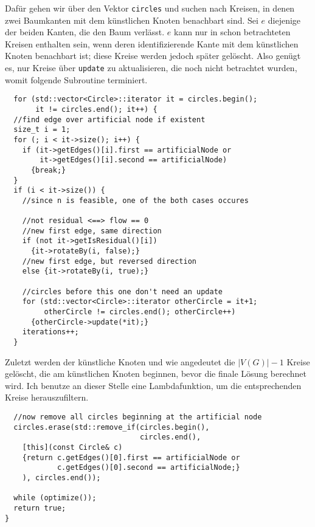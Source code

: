 Dafür gehen wir über den Vektor \lstinline|circles| und suchen nach Kreisen, in denen zwei Baumkanten mit dem künstlichen Knoten benachbart sind. Sei $e$ diejenige der beiden Kanten, die den Baum verlässt. $e$ kann nur in schon betrachteten Kreisen enthalten sein, wenn deren identifizierende Kante mit dem künstlichen Knoten benachbart ist; diese Kreise werden jedoch später gelöscht. Also genügt es, nur Kreise über \lstinline|update| zu aktualisieren, die noch nicht betrachtet wurden, womit folgende Subroutine terminiert.

\begin{lstlisting}
  for (std::vector<Circle>::iterator it = circles.begin();
       it != circles.end(); it++) {
  //find edge over artificial node if existent
  size_t i = 1;
  for (; i < it->size(); i++) {
    if (it->getEdges()[i].first == artificialNode or
        it->getEdges()[i].second == artificialNode)
      {break;}
  }
  if (i < it->size()) {
    //since n is feasible, one of the both cases occures

    //not residual <==> flow == 0
    //new first edge, same direction
    if (not it->getIsResidual()[i])
      {it->rotateBy(i, false);}
    //new first edge, but reversed direction
    else {it->rotateBy(i, true);}

    //circles before this one don't need an update 
    for (std::vector<Circle>::iterator otherCircle = it+1;
         otherCircle != circles.end(); otherCircle++)
      {otherCircle->update(*it);}
    iterations++;
  }
\end{lstlisting}

Zuletzt werden der künstliche Knoten und wie angedeutet die $|V(G)|-1$ Kreise gelöscht, die am künstlichen Knoten beginnen, bevor die finale Lösung berechnet wird. Ich benutze an dieser Stelle eine Lambdafunktion, um die entsprechenden Kreise herauszufiltern.

\begin{lstlisting}
  //now remove all circles beginning at the artificial node
  circles.erase(std::remove_if(circles.begin(), 
                               circles.end(),
    [this](const Circle& c)
    {return c.getEdges()[0].first == artificialNode or
            c.getEdges()[0].second == artificialNode;}
    ), circles.end());

  while (optimize());
  return true;
}
\end{lstlisting} 